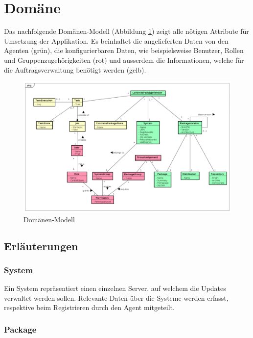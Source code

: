 \section{Domäne}

Das nachfolgende Domänen-Modell (Abbildung \ref{fig:domainmodel}) zeigt alle nötigen Attribute für Umsetzung der Applikation. Es beinhaltet die angelieferten Daten von den Agenten (grün), die konfigurierbaren Daten, wie beispielsweise Benutzer, Rollen und Gruppenzugehörigkeiten (rot) und ausserdem die Informationen, welche für die Auftragsverwaltung benötigt werden (gelb).

\begin{figure}
  \centering
    \includegraphics[width=\textwidth]{files/DomainModel_small}
  \caption{Domänen-Modell}
  \label{fig:domainmodel}
\end{figure}

\subsection*{Erläuterungen}

\subsubsection{System}

Ein System repräsentiert einen einzelnen Server, auf welchem die Updates verwaltet werden sollen. Relevante Daten über die Systeme werden erfasst, respektive beim Registrieren durch den Agent mitgeteilt.

\subsubsection{Package}

